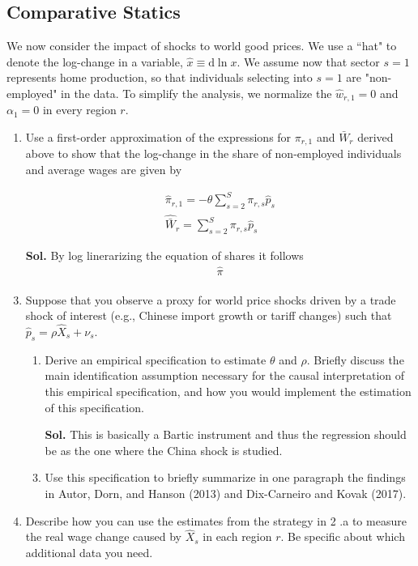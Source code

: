 \documentclass[12pt,oneside,reqno]{amsart}
\begin{document}
\subsection{Comparative Statics}

We now consider the impact of shocks to world good prices. We use a ``hat" to denote the log-change in a variable, $\hat{x} \equiv \mathrm{d} \ln x$. We assume now that sector $s=1$ represents home production, so that individuals selecting into $s=1$ are "non-employed" in the data. To simplify the analysis, we normalize the $\hat{w}_{r, 1}=0$ and $\alpha_{1}=0$ in every region $r$.

\begin{enumerate}[leftmargin=15pt,label=\textbf{\roman*.}]
\item Use a first-order approximation of the expressions for $\pi_{r, 1}$ and $\bar{W}_{r}$ derived above to show that the log-change in the share of non-employed individuals and average wages are given by

\begin{equation*}
\begin{gathered}
\hat{\pi}_{r, 1}=-\theta \sum_{s=2}^{S} \pi_{r, s} \hat{p}_{s} \\
\hat{\bar{W}}_{r}=\sum_{s=2}^{S} \pi_{r, s} \hat{p}_{s}
\end{gathered}
\end{equation*}

\item[\textbf{Sol.}] By log linerarizing the equation of shares it follows
\begin{align*}
    \hat{\pi}_{}
\end{align*}

\item Suppose that you observe a proxy for world price shocks driven by a trade shock of interest (e.g., Chinese import growth or tariff changes) such that $\hat{p}_{s}=\rho \hat{X}_{s}+\nu_{s}$.
\begin{enumerate}[label=(\alph*)]
    \item Derive an empirical specification to estimate $\theta$ and $\rho$. Briefly discuss the main identification assumption necessary for the causal interpretation of this empirical specification, and how you would implement the estimation of this specification. 
    \item[\textbf{Sol.}] This is basically a Bartic instrument and thus the regression should be as the one where the China shock is studied.  
    \item Use this specification to briefly summarize in one paragraph the findings in Autor, Dorn, and Hanson (2013) and Dix-Carneiro and Kovak (2017).
\end{enumerate}
\item Describe how you can use the estimates from the strategy in 2 .a to measure the real wage change caused by $\hat{X}_{s}$ in each region $r$. Be specific about which additional data you need.


\end{enumerate}
\end{document}
